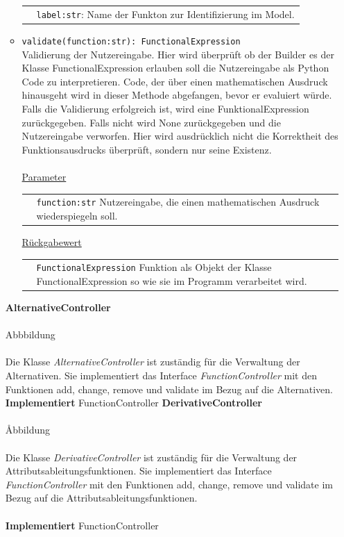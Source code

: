 \documentclass{article}
\begin{document}
\begin{itemize}
\begin{itemize}
\begin{tabular}{lp{10.7cm}}
 & \texttt{label:str}:  Name der Funkton zur Identifizierung im Model. \\
\end{tabular}
\item \texttt{validate(function:str): FunctionalExpression}\\ Validierung der Nutzereingabe. Hier wird überprüft ob der Builder es der Klasse FunctionalExpression erlauben soll die Nutzereingabe als Python Code zu interpretieren. Code, der über einen mathematischen Ausdruck hinausgeht wird in dieser Methode abgefangen, bevor er evaluiert würde. Falls die Validierung erfolgreich ist, wird eine FunktionalExpression zurückgegeben. Falls nicht wird None zurückgegeben und die Nutzereingabe verworfen. Hier wird ausdrücklich nicht die Korrektheit des Funktionsausdrucks überprüft, sondern nur seine Existenz.\\\\
\underline{{Parameter}}\\
\begin{tabular}{lp{10.7cm}}
 & \texttt{function:str}  Nutzereingabe, die einen mathematischen Ausdruck wiederspiegeln soll. \\
\end{tabular}
\newline\newline
\underline{{Rückgabewert}}\\
\begin{tabular}{lp{10.7cm}}
 & \texttt{FunctionalExpression} Funktion als Objekt der Klasse FunctionalExpression so wie sie im Programm verarbeitet wird. \\
\end{tabular}
\end{itemize}


\newpage
\textbf{\large{AlternativeController}}\\\\ Abbbildung\\\\
Die Klasse \textit{AlternativeController} ist zuständig für die Verwaltung der Alternativen. Sie implementiert das Interface \textit{FunctionController} mit den Funktionen add, change, remove und validate im Bezug auf die Alternativen.
\newline\newline
\textbf{\large{Implementiert}} FunctionController 
\newpage
\textbf{\large{DerivativeController}}\\\\Åbbildung\\\\
Die Klasse \textit{DerivativeController} ist zuständig für die Verwaltung der Attributsableitungsfunktionen. Sie implementiert das Interface \textit{FunctionController} mit den Funktionen add, change, remove und validate im Bezug auf die Attributsableitungsfunktionen.\\\\
\textbf{\large{Implementiert}} FunctionController 



\end{itemize}
\end{document}
